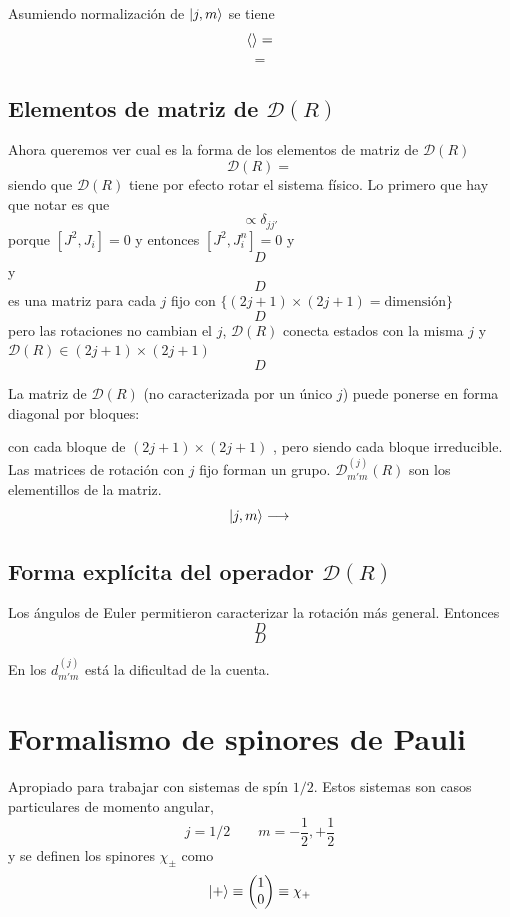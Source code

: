 \documentclass[10pt,oneside]{CBFT_book}
\begin{document}
Asumiendo normalización de $\Ket{j,m}$ se tiene 
\[
	\Braket{} = 
\]
\[
	=
\]

\subsection{Elementos de matriz de $\mathcal{D}(R)$}

Ahora queremos ver cual es la forma de los elementos de matriz de $\mathcal{D}(R)$
\[
	\mathcal{D}(R) =
\]
siendo que $\mathcal{D}(R)$ tiene por efecto rotar el sistema físico.
Lo primero que hay que notar es que 
\[
	\propto \delta_{jj'}
\]
porque $[J^2,J_i]=0$ y entonces $[J^2,J_i^n]=0$ y 
\[
	D
\]
y 
\[
	D
\]
es una matriz para cada $j$ fijo con $\{ (2j+1)\times(2j+1)=\text{dimensión}\}$
\[
	D
\]
pero las rotaciones no cambian el $j$, $\mathcal{D}(R)$ conecta estados con la misma $j$ y $\mathcal{D}(R) 
\in (2j+1)\times(2j+1)$ 
\[
	D
\]

La matriz de $\mathcal{D}(R)$ (no caracterizada por un único $j$) puede ponerse en forma diagonal por bloques:


con cada bloque de $(2j+1)\times(2j+1)$ , pero siendo cada bloque irreducible. Las matrices de rotación con 
$j$ fijo forman un grupo. $\mathcal{D}_{m'm}^{(j)}(R)$ son los elementillos de la matriz.
\[
	\Ket{j,m} \longrightarrow
\]

\subsection{Forma explícita del operador $\mathcal{D}(R)$}

Los ángulos de Euler permitieron caracterizar la rotación más general. Entonces 
\[
	D
\]
\[
	D
\]

En los $d_{m'm}^{(j)}$ está la dificultad de la cuenta.

\section{Formalismo de spinores de Pauli}

Apropiado para trabajar con sistemas de spín $1/2$. Estos sistemas son casos particulares de momento angular,
\[
	j = 1/2 \qquad m=-\frac{1}{2},+\frac{1}{2}
\]
y se definen los spinores $\chi_\pm$ como
\[
	\Ket{+} \equiv  \begin{pmatrix}
	                 1 \\ 0 
	                \end{pmatrix} \equiv  \chi_+
\]
\end{document}
